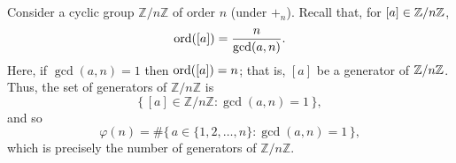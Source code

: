 \documentclass[11pt,openany]{article}
\begin{document}
\vspace{50pt}
\begin{remark*}
Consider a cyclic group \( \mathbb{Z}/n\mathbb{Z} \) of order \( n \) (under \( +_n \)). 
Recall that, for $[a]\in\mathbb{Z}/n\mathbb{Z}$, \[
\operatorname*{ord}([a])=\frac{n}{\gcd(a,n)}.
\] Here, if $\gcd(a,n)=1$ then $\operatorname*{ord}([a])=n$; that is, $[a]$ be a generator of $\mathbb{Z}/n\mathbb{Z}$.
Thus, the set of generators of \(\mathbb{Z}/n\mathbb{Z}\) is
\[
\{\, [a] \in \mathbb{Z}/n\mathbb{Z} : \gcd(a, n) = 1\,\},
\] and so \[
\varphi(n) = \#\{\, a \in \{1, 2, \dots, n\} : \gcd(a, n) = 1 \,\},
\]
which is precisely the number of generators of \(\mathbb{Z}/n\mathbb{Z}\).
\end{remark*}
\end{document}
